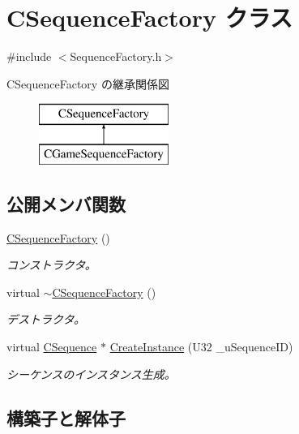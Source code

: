 \hypertarget{class_c_sequence_factory}{}\section{C\+Sequence\+Factory クラス}
\label{class_c_sequence_factory}


{\ttfamily \#include $<$Sequence\+Factory.\+h$>$}

C\+Sequence\+Factory の継承関係図\begin{figure}[H]
\begin{center}
\leavevmode
\includegraphics[height=2.000000cm]{class_c_sequence_factory}
\end{center}
\end{figure}
\subsection*{公開メンバ関数}
\begin{DoxyCompactItemize}
\item 
\hyperlink{class_c_sequence_factory_a45431bbc767b1232b42c06ce3ea88c1a}{C\+Sequence\+Factory} ()
\begin{DoxyCompactList}\small\item\em コンストラクタ。 \end{DoxyCompactList}\item 
virtual \hyperlink{class_c_sequence_factory_a62f30b0db6ff02fa8d535550d910bfda}{$\sim$\+C\+Sequence\+Factory} ()
\begin{DoxyCompactList}\small\item\em デストラクタ。 \end{DoxyCompactList}\item 
virtual \hyperlink{class_c_sequence}{C\+Sequence} $\ast$ \hyperlink{class_c_sequence_factory_aba3a273d0da93264b7d18e43d86d4c39}{Create\+Instance} (U32 \+\_\+u\+Sequence\+I\+D)
\begin{DoxyCompactList}\small\item\em シーケンスのインスタンス生成。 \end{DoxyCompactList}\end{DoxyCompactItemize}


\subsection{構築子と解体子}
\hypertarget{class_c_sequence_factory_a45431bbc767b1232b42c06ce3ea88c1a}{}
